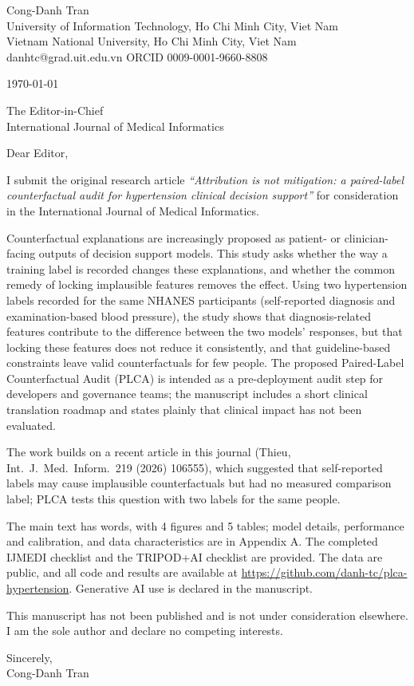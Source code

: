\documentclass[11pt]{article}
\begin{document}
Cong-Danh Tran\\
University of Information Technology, Ho Chi Minh City, Viet Nam\\
Vietnam National University, Ho Chi Minh City, Viet Nam\\
danhtc@grad.uit.edu.vn \quad ORCID 0009-0001-9660-8808

\today

The Editor-in-Chief\\
International Journal of Medical Informatics

Dear Editor,

I submit the original research article \emph{``Attribution is not mitigation: a paired-label counterfactual audit for hypertension clinical decision support''} for consideration in the International Journal of Medical Informatics.

Counterfactual explanations are increasingly proposed as patient- or clinician-facing outputs of decision support models. This study asks whether the way a training label is recorded changes these explanations, and whether the common remedy of locking implausible features removes the effect. Using two hypertension labels recorded for the same NHANES participants (self-reported diagnosis and examination-based blood pressure), the study shows that diagnosis-related features contribute to the difference between the two models' responses, but that locking these features does not reduce it consistently, and that guideline-based constraints leave valid counterfactuals for few people. The proposed Paired-Label Counterfactual Audit (PLCA) is intended as a pre-deployment audit step for developers and governance teams; the manuscript includes a short clinical translation roadmap and states plainly that clinical impact has not been evaluated.

The work builds on a recent article in this journal (Thieu, Int.\ J.\ Med.\ Inform.\ 219 (2026) 106555), which suggested that self-reported labels may cause implausible counterfactuals but had no measured comparison label; PLCA tests this question with two labels for the same people.

The main text has \WORDS{} words, with 4 figures and 5 tables; model details, performance and calibration, and data characteristics are in Appendix A. The completed IJMEDI checklist and the TRIPOD+AI checklist are provided. The data are public, and all code and results are available at \url{https://github.com/danh-tc/plca-hypertension}. Generative AI use is declared in the manuscript.

This manuscript has not been published and is not under consideration elsewhere. I am the sole author and declare no competing interests.

Sincerely,\\[4pt]
Cong-Danh Tran
\end{document}
